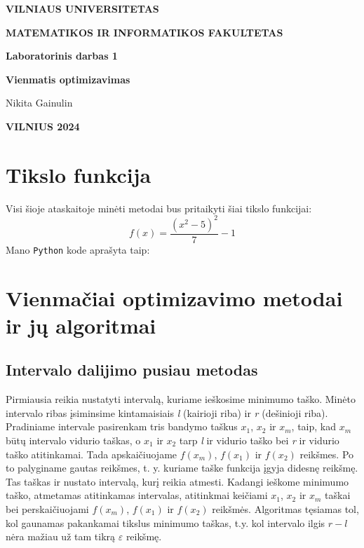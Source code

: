 \documentclass{article}
\begin{document}
\newlength{\mywidth}
\settowidth{\mywidth}{Darbo vadovas:}
\begin{titlepage}
    \vskip 20pt
    \centerline{\bf \large VILNIAUS UNIVERSITETAS}
    \bigskip
    \centerline{\large \textbf{MATEMATIKOS IR INFORMATIKOS FAKULTETAS}}
    \vskip 120pt
    \centerline{\bf \Large \textbf{Laboratorinis darbas 1}}
    \vskip 50pt
    \begin{center}
        {\bf \LARGE Vienmatis optimizavimas}
    \end{center}
    \bigskip
    \bigskip
    \centerline{\Large Nikita Gainulin}
    \vskip 90pt
    \vskip 200pt
    \centerline{\large \textbf{VILNIUS 2024}}
\end{titlepage}

\tableofcontents

\clearpage
\section{Tikslo funkcija}
Visi šioje ataskaitoje minėti metodai bus pritaikyti šiai tikslo funkcijai:
\begin{equation}\label{eq:1}
    f(x) = \frac{(x^2-5)^2}{7}-1
\end{equation}
Mano \lstinline|Python| kode aprašyta taip:

\section{Vienmačiai optimizavimo metodai ir jų algoritmai}
\subsection{Intervalo dalijimo pusiau metodas}
Pirmiausia reikia nustatyti intervalą, kuriame ieškosime minimumo taško. Minėto intervalo ribas įsiminsime kintamaisiais \textit{l} (kairioji riba) ir \textit{r} (dešinioji riba). Pradiniame intervale pasirenkam tris bandymo taškus $x_{1}$, $x_{2}$ ir $x_{m}$, taip, kad $x_{m}$ būtų intervalo vidurio taškas, o $x_{1}$ ir $x_{2}$ tarp \textit{l} ir vidurio taško bei \textit{r} ir vidurio taško atitinkamai. Tada apskaičiuojame $f(x_{m})$, $f(x_{1})$ ir $f(x_{2})$ reikšmes. Po to palyginame gautas reikšmes, t. y. kuriame taške funkcija įgyja didesnę reikšmę. Tas taškas ir nustato intervalą, kurį reikia atmesti. Kadangi ieškome minimumo taško, atmetamas atitinkamas intervalas, atitinkmai keičiami $x_{1}$, $x_{2}$ ir $x_{m}$ taškai bei perskaičiuojami $f(x_{m})$, $f(x_{1})$ ir $f(x_{2})$ reikšmės. Algoritmas tęsiamas tol, kol gaunamas pakankamai tikslus minimumo taškas, t.y. kol intervalo ilgis $r-l$ nėra mažiau už tam tikrą $\varepsilon$ reikšmę.
\end{document}
